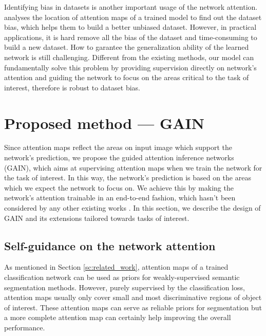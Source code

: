 \documentclass[10pt,twocolumn,letterpaper]{article}
\begin{document}
Identifying bias in datasets \cite{torralba2011unbiased} is another important usage of the network attention. \cite{grad-cam} analyses the location of attention maps of a trained model to find out the dataset bias, which helps them to build a better unbiased dataset. However, in practical applications, it is hard remove all the bias of the dataset and time-consuming to build a new dataset. How to garantee the generalization ability of the learned network is still challenging. Different from the existing methods, our model can fundamentally solve this problem by providing supervision directly on network's attention and guiding the network to focus on the areas critical to the task of interest, therefore is robust to dataset bias.


\section{Proposed method --- GAIN}

Since attention maps reflect the areas on input image which support the network's prediction, we propose the guided attention inference networks (GAIN), which aims at supervising attention maps when we train the network for the task of interest. In this way, the network's prediction is based on the areas which we expect the network to focus on. We achieve this by making the network's attention trainable in an end-to-end fashion, which hasn't been considered by any other existing works \cite{grad-cam,zhou2016learning,wei2017object,zhang2016top,singh2017hide,kim2017two}. In this section, we describe the design of GAIN and its extensions tailored towards tasks of interest. 




\subsection{Self-guidance on the network attention} \label{section:method_self}

As mentioned in Section \ref{sc:related_work}, attention maps of a trained classification network can be used as priors for weakly-supervised semantic segmentation methods. However, purely supervised by the classification loss, attention maps usually only cover small and most discriminative regions of object of interest. These attention maps can serve as reliable priors for segmentation but a more complete attention map can certainly help improving the overall performance.
\end{document}
